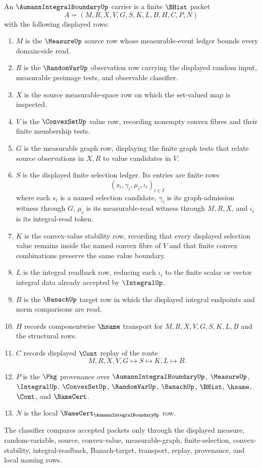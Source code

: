 \begin{definition}
\label{def:aumann-integral-boundary-carrier}
An $\AumannIntegralBoundaryUp$ carrier is a finite $\BHist$ packet
$$
A=(M,R,X,V,G,S,K,L,B,H,C,P,N)
$$
with the following displayed rows:
\begin{enumerate}
\item $M$ is the $\MeasureUp$ source row whose measurable-event ledger bounds every domain-side read.
\item $R$ is the $\RandomVarUp$ observation row carrying the displayed random input, measurable preimage tests, and observable classifier.
\item $X$ is the source measurable-space row on which the set-valued map is inspected.
\item $V$ is the $\ConvexSetUp$ value row, recording nonempty convex fibres and their finite membership tests.
\item $G$ is the measurable graph row, displaying the finite graph tests that relate source observations in $X,R$ to value candidates in $V$.
\item $S$ is the displayed finite selection ledger. Its entries are finite rows
$$
(s_i,\gamma_i,\mu_i,\iota_i)_{i\in I}
$$
where each $s_i$ is a named selection candidate, $\gamma_i$ is its graph-admission witness through $G$, $\mu_i$ is its measurable-read witness through $M,R,X$, and $\iota_i$ is its integral-read token.
\item $K$ is the convex-value stability row, recording that every displayed selection value remains inside the named convex fibre of $V$ and that finite convex combinations preserve the same value boundary.
\item $L$ is the integral readback row, reducing each $\iota_i$ to the finite scalar or vector integral data already accepted by $\IntegralUp$.
\item $B$ is the $\BanachUp$ target row in which the displayed integral endpoints and norm comparisons are read.
\item $H$ records componentwise $\hsame$ transport for $M,R,X,V,G,S,K,L,B$ and the structural rows.
\item $C$ records displayed $\Cont$ replay of the route
$$
M,R,X,V,G\longmapsto S\longmapsto K,L\longmapsto B .
$$
\item $P$ is the $\Pkg$ provenance over $\AumannIntegralBoundaryUp$, $\MeasureUp$, $\IntegralUp$, $\ConvexSetUp$, $\RandomVarUp$, $\BanachUp$, $\BHist$, $\hsame$, $\Cont$, and $\NameCert$.
\item $N$ is the local $\NameCert_{\AumannIntegralBoundaryUp}$ row.
\end{enumerate}
The classifier compares accepted packets only through the displayed measure, random-variable, source, convex-value, measurable-graph, finite-selection, convex-stability, integral-readback, Banach-target, transport, replay, provenance, and local naming rows.
\end{definition}

